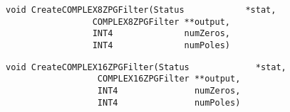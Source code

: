 \vspace{-0.1in}
\begin{verbatim}
void CreateCOMPLEX8ZPGFilter(Status            *stat,
			     COMPLEX8ZPGFilter **output,
			     INT4              numZeros,
			     INT4              numPoles)
\end{verbatim}
\vspace{-0.1in}
\begin{verbatim}
void CreateCOMPLEX16ZPGFilter(Status             *stat,
			      COMPLEX16ZPGFilter **output,
			      INT4               numZeros,
			      INT4               numPoles)
\end{verbatim}
